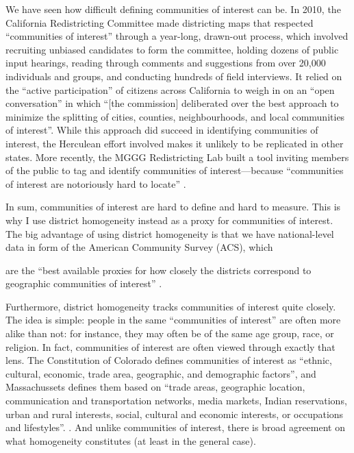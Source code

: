 \documentclass[]{article}
\begin{document}
We have seen how difficult defining communities of interest can be. In
2010, the California Redistricting Committee made districting maps that
respected ``communities of interest'' through a year-long, drawn-out
process, which involved recruiting unbiased candidates to form the
committee, holding dozens of public input hearings, reading through
comments and suggestions from over 20,000 individuals and groups, and
conducting hundreds of field interviews. It relied on the ``active
participation'' of citizens across California to weigh in on an ``open
conversation'' in which ``{[}the commission{]} deliberated over the best
approach to minimize the splitting of cities, counties, neighbourhoods,
and local communities of interest''. While this approach did succeed in
identifying communities of interest, the Herculean effort involved makes
it unlikely to be replicated in other states. More recently, the MGGG
Redistricting Lab built a tool inviting members of the public to tag and
identify communities of interest---because ``communities of interest are
notoriously hard to locate'' \citep{mggg2020}.

In sum, communities of interest are hard to define and hard to measure.
This is why I use district homogeneity instead as a proxy for
communities of interest. The big advantage of using district homogeneity
is that we have national-level data in form of the American Community
Survey (ACS), which

are the ``best available proxies for how closely the districts
correspond to geographic communities of interest''
\citet[p.~283]{steph2012}.

Furthermore, district homogeneity tracks communities of interest quite
closely. The idea is simple: people in the same ``communities of
interest'' are often more alike than not: for instance, they may often
be of the same age group, race, or religion. In fact, communities of
interest are often viewed through exactly that lens. The Constitution of
Colorado defines communities of interest as ``ethnic, cultural,
economic, trade area, geographic, and demographic factors'', and
Massachussets defines them based on ``trade areas, geographic location,
communication and transportation networks, media markets, Indian
reservations, urban and rural interests, social, cultural and economic
interests, or occupations and lifestyles''. \citep{brennan}. And unlike
communities of interest, there is broad agreement on what homogeneity
constitutes (at least in the general case).
\end{document}
